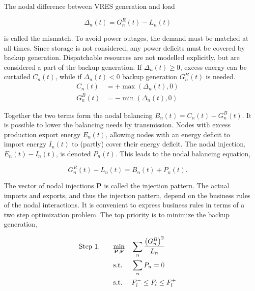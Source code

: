 \documentclass[a4paper, 5p, sort&compress]{elsarticle}%
\newcommand{\paren}[1]{\left(#1\right)}
\begin{document}
The nodal difference between VRES generation and load

\begin{equation}
  \Delta_{n}(t) = G^{R}_{n}(t) - L_{n}(t)
\end{equation}

is called the mismatch. To avoid power outages, the demand must be
matched at all times. Since storage is not considered, any power
deficits must be covered by backup generation. Dispatchable
resources are not modelled explicitly, but are considered a part of
the backup generation. If $\Delta_{n}(t) \geq 0$, excess energy can be
curtailed $C_{n}(t)$, while if $\Delta_{n}(t) < 0$ backup generation
$G^{B}_{n}(t)$ is needed.
\begin{align}
  C_{n}(t) &= + \max \paren{\Delta_{n}(t),0} \\
  G^{B}_{n}(t) &= - \min \phantom{} \paren{\Delta_{n}(t),0} 
\end{align}

Together the two terms form the nodal balancing
$B_{n}(t) = C_{n}(t) - G^{B}_{n}(t)$.  It is possible to lower the
balancing needs by transmission. Nodes with excess production export
energy $E_{n}(t)$, allowing nodes with an energy deficit to import
energy $I_{n}(t)$ to (partly) cover their energy deficit. The nodal
injection, $E_{n}(t) - I_{n}(t)$, is denoted $P_{n}(t)$. This leads to
the nodal balancing equation,

\begin{equation}
  \label{eq:nodal-balancing}
  G^{R}_{n}(t) - L_{n}(t) = B_{n}(t) + P_{n}(t) .
\end{equation}

The vector of nodal injections $\mathbf{P}$ is called the injection
pattern. The actual imports and exports, and thus the injection
pattern, depend on the business rules of the nodal interactions. It is
convenient to express business rules in terms of a two step
optimization problem. The top priority is to minimize the backup
generation,

\begin{equation}
  \label{eq:step1}
  \begin{aligned}
    \text{Step 1: \hspace{15pt}}& \underset{\mathbf{P}, \mathbf{F}}{\text{min}}
    & & \sum_{n} \frac{\paren{G_{n}^{B}}^{2}}{L_{n}} \\
    & \text{s.t.}
    & & \sum_{n} P_{n} = 0 \\ %
    & \text{s.t.}
    & & F_{l}^{-} \leq F_{l} \leq F_{l}^{+}
  \end{aligned}
\end{equation}
\end{document}

